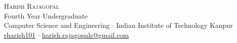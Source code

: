 \newcommand{\sep}{$\cdot$}%

\begin{center}

\textsc{\huge Harish Rajagopal}\\[2mm]
Fourth Year Undergraduate\\[1mm]
Computer Science and Engineering \sep{} Indian Institute of Technology Kanpur\\[1mm]
\faGithub{} \href{https://github.com/rharish101}{rharish101} \sep{}
{\faEnvelopeO{} \href{mailto:harish.rajagopals@gmail.com}{harish.rajagopals@gmail.com}}

\end{center}
